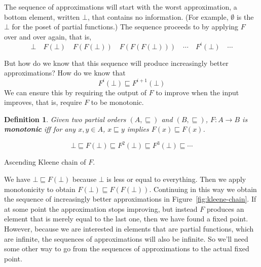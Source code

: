 \documentclass{tufte-handout}
\newtheorem{definition}{Definition}%
\begin{document}
The sequence of approximations will start with the worst
approximation, a bottom element, written $\bot$, that contains no
information. (For example, $\emptyset$ is the $\bot$ for the poset of
partial functions.)
The sequence proceeds to by applying $F$ over and over again, that is,
\[
  \bot \quad F(\bot)\quad F(F(\bot))\quad F(F(F(\bot)))\quad \cdots\quad F^i(\bot)\quad \cdots
\]

But how do we know that this sequence will produce increasingly better
approximations?  How do we know that
\[
F^i(\bot) \sqsubseteq F^{i+1}(\bot)
\]
We can ensure this by requiring the output of $F$ to improve when the
input improves, that is, require $F$ to be monotonic.

\begin{definition}
  Given two partial orders $(A,\sqsubseteq)$ and
  $(B,\sqsubseteq)$, $F : A {\to} B$ is \textbf{\emph{monotonic}} iff
  for any $x,y\in A$, $x \sqsubseteq y$ implies $F(x) \sqsubseteq F(x)$.
\end{definition}

\begin{marginfigure}
\[
  \bot \sqsubseteq F(\bot) \sqsubseteq F^2(\bot) 
    \sqsubseteq F^3(\bot) \sqsubseteq \cdots
\]
\caption{Ascending Kleene chain of $F$.}
\label{fig:kleene-chain}
\end{marginfigure}
%
We have $\bot \sqsubseteq F(\bot)$ because $\bot$ is less or equal to
everything. Then we apply monotonicity to obtain $F(\bot) \sqsubseteq
F(F(\bot))$.  Continuing in this way we obtain the sequence of
increasingly better approximations in Figure~\ref{fig:kleene-chain}.
If at some point the approximation stops improving, but instead $F$
produces an element that is merely equal to the last one, then we have
found a fixed point. However, because we are interested in elements
that are partial functions, which are infinite, the sequences of
approximations will also be infinite. So we'll need some other way to
go from the sequences of approximations to the actual fixed point.
\end{document}
